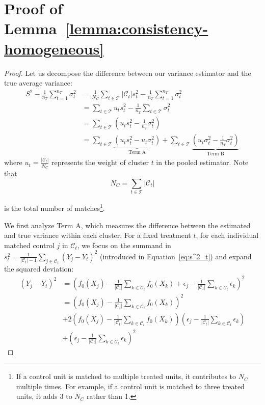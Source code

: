 \documentclass{mytemplate}
\begin{document}
\section{Proof of Lemma~\ref{lemma:consistency-homogeneous}}
\label{sec:proof-lemma:consistency-homogeneous}
\begin{proof}
Let us decompose the difference between our variance estimator and the true average variance:
\begin{align*}
    S^2 - \frac{1}{n_T} \sum_{t=1}^{n_T} \sigma_t^2 
    &= \frac{1}{N_C} \sum_{t \in \mathcal{T}} |\mathcal{C}_t| s_t^2 - \frac{1}{n_T} \sum_{t=1}^{n_T} \sigma_t^2 \\
    &= \sum_{t \in \mathcal{T}} u_t s_t^2 - \frac{1}{n_T} \sum_{t \in \mathcal{T}} \sigma_t^2 \\
    &= \sum_{t \in \mathcal{T}} (u_t s_t^2 - \frac{1}{n_T} \sigma_t^2) \\
    &= \sum_{t \in \mathcal{T}} \underbrace{(u_t s_t^2 - u_t \sigma_t^2)}_{\text{Term A}} + \sum_{t \in \mathcal{T}} \underbrace{(u_t \sigma_t^2 - \frac{1}{n_T} \sigma_t^2)}_{\text{Term B}}
\end{align*}
where $u_t = \frac{|\mathcal{C}_t|}{N_C}$ represents the weight of cluster $t$ in the pooled estimator. Note that 
\begin{equation}
\label{eq:N_C}
N_C = \sum_{t \in \mathcal{T}} |\mathcal{C}_t|    
\end{equation}


is the total number of matches\footnote{If a control unit is matched to multiple treated units, it contributes to $N_C$ multiple times. For example, if a control unit is matched to three treated units, it adds 3 to $N_C$ rather than 1.}.


We first analyze Term A, which measures the difference between the estimated and true variance within each cluster. For a fixed treatment $t$, for each individual matched control $j$ in $\mathcal{C}_t$, we focus on the summand in $s_t^2 = \frac{1}{|\mathcal{C}_t| - 1} \sum_{j \in \mathcal{C}_t} (Y_{j} - \bar{Y}_t)^2$ (introduced in Equation~\ref{eq:s^2_t}) and expand the squared deviation:
\begin{align*}
(Y_j - \bar{Y}_t)^2 &= \left(f_0(X_j) - \frac{1}{|\mathcal{C}_t|} \sum_{k \in \mathcal{C}_t} f_0(X_k) + \epsilon_j - \frac{1}{|\mathcal{C}_t|} \sum_{k \in \mathcal{C}_t} \epsilon_k \right)^2 \\
&= \left(f_0(X_j) - \frac{1}{|\mathcal{C}_t|} \sum_{k \in \mathcal{C}_t} f_0(X_k)\right)^2 \\
&+ 2\left(f_0(X_j) - \frac{1}{|\mathcal{C}_t|} \sum_{k \in \mathcal{C}_t} f_0(X_k)\right)\left(\epsilon_j - \frac{1}{|\mathcal{C}_t|} \sum_{k \in \mathcal{C}_t} \epsilon_k\right) \\
&+ \left(\epsilon_j - \frac{1}{|\mathcal{C}_t|} \sum_{k \in \mathcal{C}_t} \epsilon_k\right)^2
\end{align*}


\end{proof}
\end{document}
